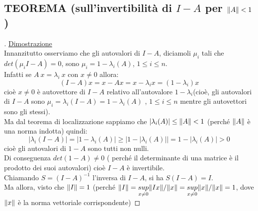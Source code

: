 \subsection{TEOREMA (sull'invertibilità di $I-A$ per $\lVert A\rVert<1$)}
\begin{center}
\end{center}
\begin{proof}[\unskip\nopunct]
\uline{Dimostrazione}\\
Innanzitutto osserviamo che gli autovalori di $I-A$, diciamoli $\mu_i$ tali che $det(\mu_iI-A)=0$,
sono $ \mu_i = 1 - \lambda_i (A)$, $1 \leq i \leq n$.\\
Infatti se $ A\ x = \lambda_i\ x$ con $x \neq 0$ allora:
\begin{equation*}
    (I-A)x = x-A x = x - \lambda_i x = (1- \lambda_i) x
\end{equation*}
cioè $x\neq 0$ è autovettore di $I-A$ relativo all'autovalore $1-\lambda_i$(cioè, gli autovalori di $I-A$ sono $\mu_i=\lambda_i(I-A)=1-\lambda_i(A)$ , $1\leq i \leq n$ mentre gli autovettori sono gli stessi).\\
Ma dal teorema di localizzazione sappiamo che $|\lambda_i(A)|\leq \lVert A \rVert< 1$ (perché $\lVert A \rVert$ è una norma indotta) quindi:
\begin{equation*}
    | \lambda_i(I-A) | = | 1-\lambda_i(A) | \geq \big | 1-|\lambda_i(A)| \big | = 1 - | \lambda_i(A) | > 0
\end{equation*}
cioè gli autovalori di $1-A$ sono tutti non nulli. \\
Di conseguenza $det(1-A)\neq 0$ ( perché il determinante di una matrice è il prodotto dei suoi autovalori) cioè $I-A$ è invertibile.\\
Chiamando $S = (I-A)^{-1}$ l'inversa di $I-A$, si ha $S(I-A) = I$. \\ Ma allora, visto che $\lVert I\rVert = 1$ (perché $\lVert I\rVert = \underset{x \neq 0}{sup}\lVert Ix\rVert/\lVert x\rVert =\underset{x \neq 0}{sup}\lVert x\rVert/\lVert x\rVert = 1 $, dove $\lVert x\rVert$ è la norma vettoriale corrispondente)

\end{proof}
